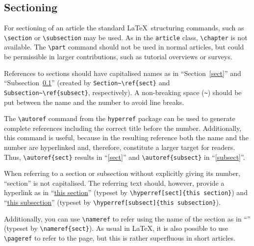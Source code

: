 \documentclass{eceasst}
\begin{document}
\subsection{Sectioning}\label{subsect}\label{sectioning}
For sectioning of an article the standard \LaTeX\ structuring commands, such
as \verb|\section| or \verb|\subsection| may be used.
As in the \verb|article| class, \verb|\chapter| is not available.
The \verb|\part| command should not be used in normal articles, but could be
permissible in larger contributions, such as tutorial overviews or surveys.

References to sections should have capitalised names as in
``Section~\ref{sect}'' and ``Subsection~\ref{subsect}'' (created by
\verb|Section~\ref{sect}| and \verb|Subsection~\ref{subsect}|, respectively).
A non-breaking space (\verb|~|) should be put between the name and the number
to avoid line breaks.

The \verb|\autoref| command from the \verb|hyperref| package can be used to
generate complete references including the correct title before the number.
Additionally, this command is useful, because in the resulting reference both
the name and the number are hyperlinked and, therefore, constitute a larger
target for readers.
Thus, \verb|\autoref{sect}| results in ``\autoref{sect}'' and
\verb|\autoref{subsect}| in ``\autoref{subsect}''.

When referring to a section or subsection without explicitly giving its number,
``section'' is not capitalised.
The referring text should, however, provide a hyperlink as in
``\hyperref[sect]{this section}'' (typeset by
\verb|\hyperref[sect]{this section}|) and
``\hyperref[subsect]{this subsection}''
(typeset by \verb|\hyperref[subsect]{this subsection}|).

Additionally, you can use \verb|\nameref| to refer using the name of the
section as in ``'' (typeset by \verb|\nameref{sect}|).
As usual in \LaTeX, it is also possible to use \verb|\pageref| to refer to the
page, but this is rather superfluous in short articles.
\end{document}
